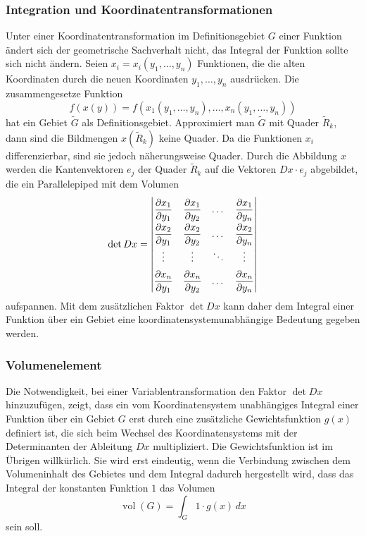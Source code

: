 \subsubsection{Integration und Koordinatentransformationen}
Unter einer Koordinatentransformation im Definitionsgebiet 
$G$ einer Funktion ändert sich der geometrische Sachverhalt nicht,
das Integral der Funktion sollte sich nicht ändern.
Seien $x_i=x_i(y_1,\dots,y_n)$ Funktionen, die die alten Koordinaten
durch die neuen Koordinaten $y_1,\dots,y_n$ ausdrücken.
Die zusammengesetze Funktion
\[
f(x(y))
=
f(x_1(y_1,\dots,y_n),\dots,x_n(y_1,\dots,y_n))
\]
hat ein Gebiet $\tilde{G}$ als Definitionsgebiet.
Approximiert man $\tilde{G}$ mit Quader $\tilde{R}_k$, dann sind
die Bildmengen $x(\tilde{R}_k)$ keine Quader.
Da die Funktionen $x_i$ differenzierbar, sind sie jedoch näherungsweise
Quader.
Durch die Abbildung $x$ werden die Kantenvektoren $e_j$ der Quader 
$\tilde{R}_k$ auf die Vektoren $Dx\cdot e_j$ abgebildet, die ein
Parallelepiped mit dem Volumen
\[
\det Dx
=
\left|
\renewcommand{\arraystretch}{1.9}
\begin{matrix}
\displaystyle
\frac{\partial x_1}{\partial y_1}
&
\displaystyle
\frac{\partial x_1}{\partial y_2}
&\dots&
\displaystyle
\frac{\partial x_1}{\partial y_n}
\\
\displaystyle
\frac{\partial x_2}{\partial y_1}
&
\displaystyle
\frac{\partial x_2}{\partial y_2}
&\dots&
\displaystyle
\frac{\partial x_2}{\partial y_n}
\\
\vdots&\vdots&\ddots&\vdots\\
\displaystyle
\frac{\partial x_n}{\partial y_1}
&
\displaystyle
\frac{\partial x_n}{\partial y_2}
&\dots&
\displaystyle
\frac{\partial x_n}{\partial y_n}
\end{matrix}
\right|
\]
aufspannen.
Mit dem zusätzlichen Faktor $\det Dx$ kann daher dem Integral einer Funktion
über ein Gebiet eine koordinatensystemunabhängige Bedeutung gegeben werden.

%
%
\subsubsection{Volumenelement}
Die Notwendigkeit, bei einer Variablentransformation den Faktor
$\det Dx$ hinzuzufügen, zeigt, dass ein vom Koordinatensystem unabhängiges
Integral einer Funktion über ein Gebiet $G$ erst durch eine zusätzliche
Gewichtsfunktion $g(x)$ definiert ist, die sich beim Wechsel des
Koordinatensystems mit der Determinanten der Ableitung $Dx$ multipliziert.
Die Gewichtsfunktion ist im Übrigen willkürlich.
Sie wird erst eindeutig,
wenn die Verbindung zwischen dem Volumeninhalt des Gebietes und 
dem Integral dadurch hergestellt wird, dass das Integral der konstanten
Funktion $1$ das Volumen
\[
\operatorname{vol}(G)
=
\int_G 1\cdot g(x)\,dx
\]
sein soll.

